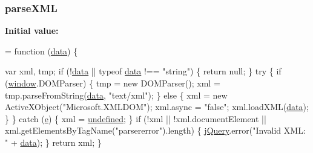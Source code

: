 \subsubsection[{\texorpdfstring{parse\+X\+ML}{parseXML}}]{ parse\+X\+ML}\hypertarget{jquery-2_82_81-vsdoc_8js_ab58e01f0a789f6062d3b05417f56140e}{}\label{jquery-2_82_81-vsdoc_8js_ab58e01f0a789f6062d3b05417f56140e}
{\bfseries Initial value\+:}
\begin{DoxyCode}
= \textcolor{keyword}{function} (\hyperlink{jquery-2_82_81-vsdoc_8js_a609407b3456fdc3c5671a9fc4a226ff7}{data}) \{
        

        var xml, tmp;
        \textcolor{keywordflow}{if} (!\hyperlink{jquery-2_82_81-vsdoc_8js_a609407b3456fdc3c5671a9fc4a226ff7}{data} || typeof \hyperlink{jquery-2_82_81-vsdoc_8js_a609407b3456fdc3c5671a9fc4a226ff7}{data} !== \textcolor{stringliteral}{"string"}) \{
            \textcolor{keywordflow}{return} null;
        \}
        \textcolor{keywordflow}{try} \{
            \textcolor{keywordflow}{if} (\hyperlink{jquery-2_82_81-vsdoc_8js_a04a8a2bbfa9c15500892b8e5033d625b}{window}.DOMParser) \{ 
                tmp = \textcolor{keyword}{new} DOMParser();
                xml = tmp.parseFromString(\hyperlink{jquery-2_82_81-vsdoc_8js_a609407b3456fdc3c5671a9fc4a226ff7}{data}, \textcolor{stringliteral}{"text/xml"});
            \} \textcolor{keywordflow}{else} \{ 
                xml = \textcolor{keyword}{new} ActiveXObject(\textcolor{stringliteral}{"Microsoft.XMLDOM"});
                xml.async = \textcolor{stringliteral}{"false"};
                xml.loadXML(\hyperlink{jquery-2_82_81-vsdoc_8js_a609407b3456fdc3c5671a9fc4a226ff7}{data});
            \}
        \} \textcolor{keywordflow}{catch} (\hyperlink{packages_2bootstrap_83_83_86_2content_2_scripts_2bootstrap_8min_8js_ab5902775854a8b8440bcd25e0fe1c120}{e}) \{
            xml = \hyperlink{jquery-2_82_81-vsdoc_8js_a08113a236cc18d2a9d5ce27e638012be}{undefined};
        \}
        \textcolor{keywordflow}{if} (!xml || !xml.documentElement || xml.getElementsByTagName(\textcolor{stringliteral}{"parsererror"}).length) \{
            \hyperlink{jquery-2_82_81-vsdoc_8js_add5237586d970a38a81f990e8eb28c6c}{jQuery}.error(\textcolor{stringliteral}{"Invalid XML: "} + \hyperlink{jquery-2_82_81-vsdoc_8js_a609407b3456fdc3c5671a9fc4a226ff7}{data});
        \}
        \textcolor{keywordflow}{return} xml;
    \}
\end{DoxyCode}
